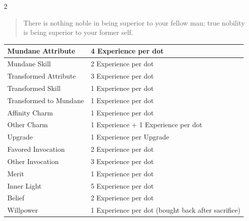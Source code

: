 \begin{multicols}{2}
\begin{quote}There is nothing noble in being superior to your fellow man; true nobility is being superior to your former self.\\
 \end{quote}
\label{sec:CharacterAdvancement}

    \centering
    \begin{tabular}{|l|l|}
        \hline
        Mundane Attribute       & 4 Experience per dot                                \\ \hline
        Mundane Skill           & 2 Experience per dot                                \\ \hline
        Transformed Attribute   & 3 Experience per dot                                \\ \hline
        Transformed Skill       & 1 Experience per dot                                \\ \hline
        Transformed to Mundane  & 1 Experience per dot  \\ \hline
        Affinity Charm          & 1 Experience per dot                                            \\ \hline
        Other Charm             & 1 Experience + 1 Experience per dot                                           \\ \hline
        Upgrade          	 & 1 Experience per Upgrade                                                   \\ \hline
        Favored Invocation     & 2 Experience per dot                                        \\ \hline
        Other Invocation        & 3 Experience per dot                                        \\ \hline
        Merit                   & 1 Experience per dot                                        \\ \hline
        Inner Light             & 5 Experience per dot                                       \\ \hline
        Belief                  & 2 Experience per dot                                    \\ \hline
        Willpower               & 1 Experience per dot (bought back after sacrifice)                     \\
        \hline
    \end{tabular}	
     

\end{multicols}
